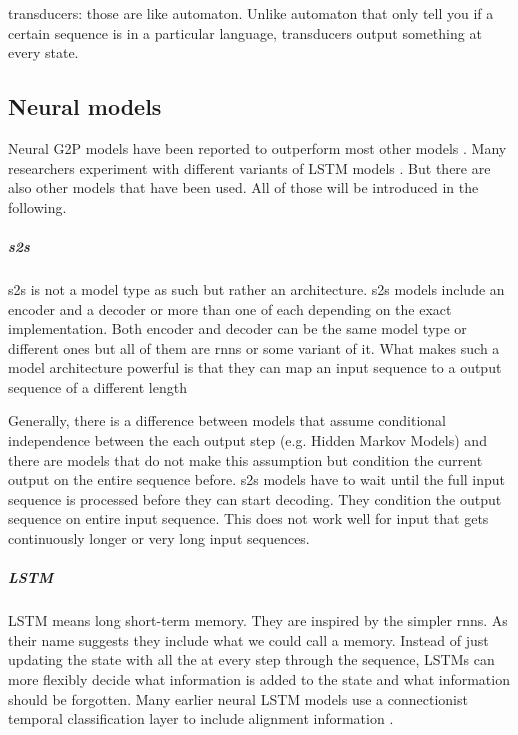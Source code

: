 
transducers: those are like automaton. Unlike automaton that only tell you if a certain sequence is in a particular language, transducers output something at every state. 

\subsection{Neural models}
Neural G2P models have been reported to outperform most other models \citep{Lee&Ashby.2020}. Many researchers experiment with different variants of LSTM models \citep{Lee&Ashby.2020, hammond-2021-data, gautam.2021, Rao2015GraphemetophonemeCU}. But there are also other models that have been used. All of those will be introduced in the following.

\subparagraph{\ac{s2s}}
\ac{s2s} is not a model type as such but rather an architecture. \ac{s2s} models include an encoder and a decoder or more than one of each depending on the exact implementation. Both encoder and decoder can be the same model type or different ones but all of them are \acp{rnn} or some variant of it. What makes such a model architecture powerful is that they can map an input sequence to a output sequence of a different length 


Generally, there is a difference between models that assume conditional independence between the each output step (e.g. Hidden Markov Models) and there are models that do not make this assumption but condition the current output on the entire sequence before. \ac{s2s} models have to wait until the full input sequence is processed before they can start decoding. They condition the output sequence on entire input sequence. This does not work well for input that gets continuously longer or very long input sequences. 

\subparagraph{LSTM}
LSTM means long short-term memory. They are inspired by the simpler \acp{rnn}. As their name suggests they include what we could call a memory. Instead of just updating the state with all the at every step through the sequence, LSTMs can more flexibly decide what information is added to the state and what information should be forgotten.
Many earlier neural LSTM models use a connectionist temporal classification layer to include alignment information \citep{lo-nicolai-2021-linguistic}. 

